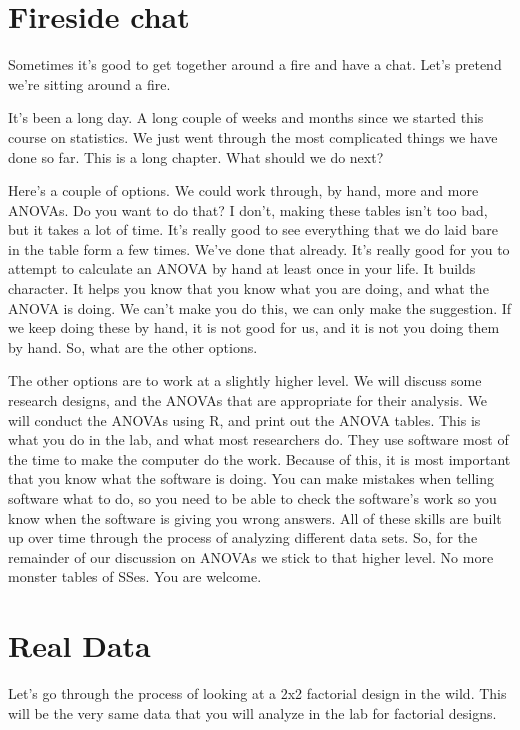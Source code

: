\documentclass[
]{book}
\begin{document}
\section{Fireside chat}\label{fireside-chat}

Sometimes it's good to get together around a fire and have a chat. Let's pretend we're sitting around a fire.

It's been a long day. A long couple of weeks and months since we started this course on statistics. We just went through the most complicated things we have done so far. This is a long chapter. What should we do next?

Here's a couple of options. We could work through, by hand, more and more ANOVAs. Do you want to do that? I don't, making these tables isn't too bad, but it takes a lot of time. It's really good to see everything that we do laid bare in the table form a few times. We've done that already. It's really good for you to attempt to calculate an ANOVA by hand at least once in your life. It builds character. It helps you know that you know what you are doing, and what the ANOVA is doing. We can't make you do this, we can only make the suggestion. If we keep doing these by hand, it is not good for us, and it is not you doing them by hand. So, what are the other options.

The other options are to work at a slightly higher level. We will discuss some research designs, and the ANOVAs that are appropriate for their analysis. We will conduct the ANOVAs using R, and print out the ANOVA tables. This is what you do in the lab, and what most researchers do. They use software most of the time to make the computer do the work. Because of this, it is most important that you know what the software is doing. You can make mistakes when telling software what to do, so you need to be able to check the software's work so you know when the software is giving you wrong answers. All of these skills are built up over time through the process of analyzing different data sets. So, for the remainder of our discussion on ANOVAs we stick to that higher level. No more monster tables of SSes. You are welcome.

\section{Real Data}\label{real-data-1}

Let's go through the process of looking at a 2x2 factorial design in the wild. This will be the very same data that you will analyze in the lab for factorial designs.
\end{document}
